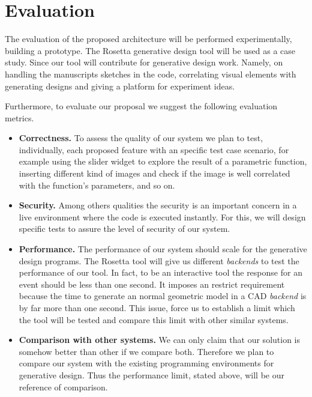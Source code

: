 
% 
% 
\section{Evaluation}
\label{sec:eval}

The evaluation of the proposed architecture will be performed experimentally, building a prototype. The Rosetta generative design tool will be used as a case study. Since our tool will contribute for generative design work. Namely, on handling the manuscripts sketches in the code, correlating visual elements with generating designs and giving a platform for experiment ideas.

Furthermore, to evaluate our proposal we suggest the following evaluation metrics.

\begin{itemize}
\item \textbf{Correctness.} To assess the quality of our system we plan to test, individually, each proposed feature with an specific test case scenario, for example using the slider widget to explore the result of a parametric function, inserting different kind of images and check if the image is well correlated with the function's parameters, and so on. 

\item \textbf{Security.} Among others qualities the security is an important concern in a live environment where the code is executed instantly. For this, we will design specific tests to assure the level of security of our system.

\item \textbf{Performance.} The performance of our system should scale for the generative design programs. The Rosetta tool will give us different \textit{backends} to test the performance of our tool. In fact, to be an interactive tool the response for an event should be less than one second. It imposes an restrict requirement because the time to generate an normal geometric model in a CAD \textit{backend} is by far more than one second. This issue, force us to establish a limit which the tool will be tested and compare this limit with other similar systems.

\item \textbf{Comparison with other systems.} We can only claim that our solution is somehow better than other if we compare both. Therefore we plan to compare our system with the existing programming environments for generative design. Thus the performance limit, stated above, will be our reference of comparison.
\end{itemize}